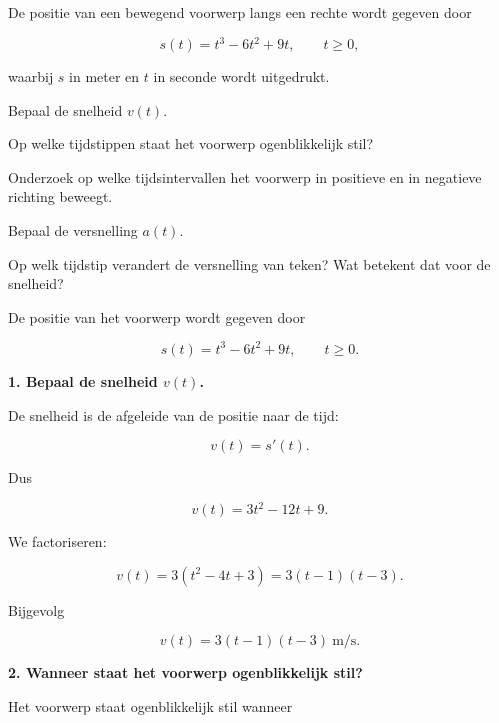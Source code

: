 \documentclass{ximera}
\begin{document}
\begin{oefening}{\oefU\ESS}

De positie van een bewegend voorwerp langs een rechte wordt gegeven
door

\[
s(t)=t^3-6t^2+9t,
\qquad t\geq0,
\]

waarbij $s$ in meter en $t$ in seconde wordt uitgedrukt.

\begin{question}
Bepaal de snelheid $v(t)$.
\end{question}

\begin{question}
Op welke tijdstippen staat het voorwerp ogenblikkelijk stil?
\end{question}

\begin{question}
Onderzoek op welke tijdsintervallen het voorwerp in positieve en in
negatieve richting beweegt.
\end{question}

\begin{question}
Bepaal de versnelling $a(t)$.
\end{question}

\begin{question}
Op welk tijdstip verandert de versnelling van teken?
Wat betekent dat voor de snelheid?
\end{question}

\begin{oplossing}

  De positie van het voorwerp wordt gegeven door
  
  \[
  s(t)=t^3-6t^2+9t,
  \qquad t\geq 0.
  \]
  
  \textbf{1. Bepaal de snelheid $v(t)$.}
  
  De snelheid is de afgeleide van de positie naar de tijd:
  
  \[
  v(t)=s'(t).
  \]
  
  Dus
  
  \[
  v(t)=3t^2-12t+9.
  \]
  
  We factoriseren:
  
  \[
  v(t)
  =3(t^2-4t+3)
  =3(t-1)(t-3).
  \]
  
  Bijgevolg
  
  \[
  \boxed{v(t)=3(t-1)(t-3)\ \text{m/s}.}
  \]
  
  \textbf{2. Wanneer staat het voorwerp ogenblikkelijk stil?}
  
  Het voorwerp staat ogenblikkelijk stil wanneer
  

\end{oplossing}
\end{oefening}
\end{document}

